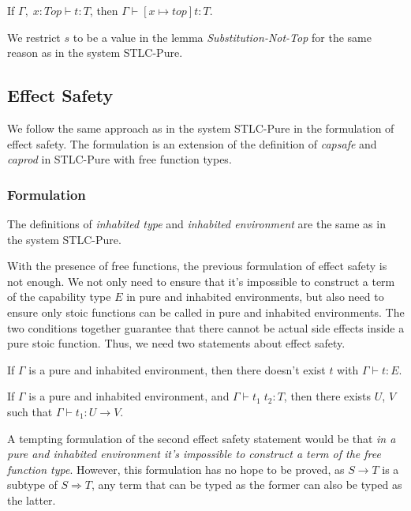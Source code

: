 \begin{lemma}
  If $\Gamma,\; x:Top \vdash t : T$, then $\Gamma \vdash [x \mapsto top]t : T$.
\end{lemma}

We restrict $s$ to be a value in the lemma \emph{Substitution-Not-Top}
for the same reason as in the system STLC-Pure.

\subsection{Effect Safety}

We follow the same approach as in the system STLC-Pure in the
formulation of effect safety. The formulation is an extension of the
definition of \emph{capsafe} and \emph{caprod} in STLC-Pure with free
function types.

\subsubsection{Formulation}

The definitions of \emph{inhabited type} and \emph{inhabited
  environment} are the same as in the system STLC-Pure.

With the presence of free functions, the previous formulation of
effect safety is not enough. We not only need to ensure that it's
impossible to construct a term of the capability type $E$ in pure and
inhabited environments, but also need to ensure only stoic functions
can be called in pure and inhabited environments. The two conditions
together guarantee that there cannot be actual side effects inside a
pure stoic function. Thus, we need two statements about effect safety.

\begin{definition}
  If $\Gamma$ is a pure and inhabited environment, then there doesn't
  exist $t$ with $\Gamma \vdash t : E$.
\end{definition}

\begin{definition}
  If $\Gamma$ is a pure and inhabited environment, and
  $\Gamma \vdash t_1 \; t_2 : T$, then there exists $U$, $V$ such that
  $\Gamma \vdash t_1 : U \to V$.
\end{definition}

A tempting formulation of the second effect safety statement would be
that \emph{in a pure and inhabited environment it's impossible to
  construct a term of the free function type}. However, this
formulation has no hope to be proved, as $S \to T$ is a subtype of
$S \Rightarrow T$, any term that can be typed as the former can also
be typed as the latter.

